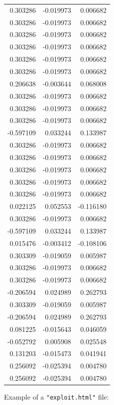 \documentclass[a4paper,twoside,12pt]{book}
\begin{document}
\begin{appendices}
\begin{table}
\begin{tabular}{rrr}
	 0.303286 & -0.019973 &  0.006682 \\
	 0.303286 & -0.019973 &  0.006682 \\
	 0.303286 & -0.019973 &  0.006682 \\
	 0.303286 & -0.019973 &  0.006682 \\
	 0.303286 & -0.019973 &  0.006682 \\
	 0.303286 & -0.019973 &  0.006682 \\
	 0.206638 & -0.003644 &  0.068008 \\
	 0.303286 & -0.019973 &  0.006682 \\
	 0.303286 & -0.019973 &  0.006682 \\
	 0.303286 & -0.019973 &  0.006682 \\
	-0.597109 &  0.033244 &  0.133987 \\
	 0.303286 & -0.019973 &  0.006682 \\
	 0.303286 & -0.019973 &  0.006682 \\
	 0.303286 & -0.019973 &  0.006682 \\
	 0.303286 & -0.019973 &  0.006682 \\
	 0.303286 & -0.019973 &  0.006682 \\
	 0.022125 &  0.052553 & -0.116180 \\
	 0.303286 & -0.019973 &  0.006682 \\
	-0.597109 &  0.033244 &  0.133987 \\
	 0.015476 & -0.003412 & -0.108106 \\
	 0.303309 & -0.019059 &  0.005987 \\
	 0.303286 & -0.019973 &  0.006682 \\
	 0.303286 & -0.019973 &  0.006682 \\
	-0.206594 &  0.024989 &  0.262793 \\
	 0.303309 & -0.019059 &  0.005987 \\
	-0.206594 &  0.024989 &  0.262793 \\
	 0.081225 & -0.015643 &  0.046059 \\
	-0.052792 &  0.005908 &  0.025548 \\
	 0.131203 & -0.015473 &  0.041941 \\
	 0.256092 & -0.025394 &  0.004780 \\
	 0.256092 & -0.025394 &  0.004780 \\
	\bottomrule
\end{tabular}
\end{table}
   
Example of a \lstinline|"exploit.html"| file:


\end{appendices}
\end{document}
